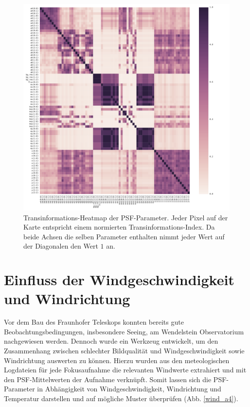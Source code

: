 \begin{figure}[H]
	\centering
	\includegraphics[scale=.56]{heatmaps/psf.pdf}
	\caption[Transinformations-Heatmap der PSF-Parameter]{Transinformations-Heatmap der PSF-Parameter. Jeder Pixel auf der Karte entspricht einem normierten Transinformations-Index. Da beide Achsen die selben Parameter enthalten nimmt jeder Wert auf der Diagonalen den Wert $\num{1}$ an.}
    \label{psf_heatmap}
\end{figure}

\section{Einfluss der Windgeschwindigkeit und Windrichtung}
Vor dem Bau des Fraunhofer Teleskops konnten bereits gute Beobachtungsbedingungen, insbesondere Seeing, am Wendelstein Observatorium nachgewiesen werden\cite{wendelstein_seeing}. Dennoch wurde ein Werkzeug entwickelt, um den Zusammenhang zwischen schlechter Bildqualität und Windgeschwindigkeit sowie Windrichtung auswerten zu können. Hierzu wurden aus den meteologischen Logdateien für jede Fokusaufnahme die relevanten Windwerte extrahiert und mit den PSF-Mittelwerten der Aufnahme verknüpft. Somit lassen sich die PSF-Parameter in Abhängigkeit von Windgeschwindigkeit, Windrichtung und Temperatur darstellen und auf mögliche Muster überprüfen (Abb. \ref{wind_a4}).

